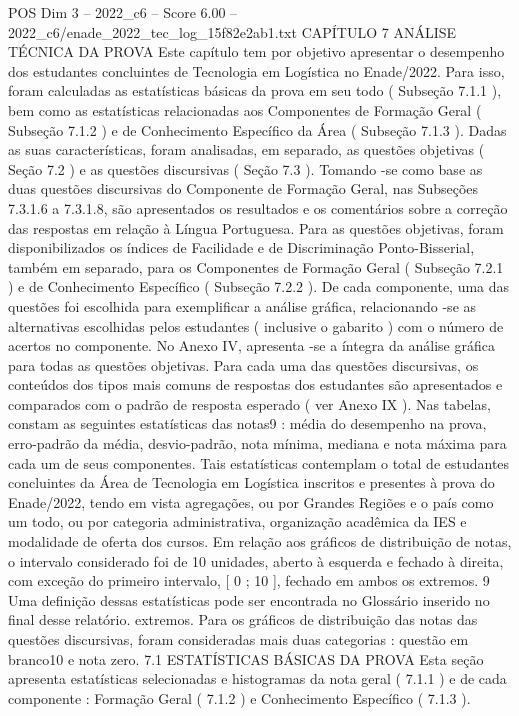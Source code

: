 \begin{textsample}{POS Dim 3 – 2022\_c6 – Score 6.00 – 2022\_c6/enade\_2022\_tec\_log\_15f82e2ab1.txt}  \label{ex:f3_pos_028}
CAPÍTULO 7 ANÁLISE TÉCNICA DA PROVA Este capítulo tem por objetivo apresentar o desempenho dos estudantes concluintes de Tecnologia em Logística no Enade/2022.
Para isso, foram calculadas as estatísticas básicas da prova em seu todo ( Subseção 7.1.1 ), bem como as estatísticas relacionadas aos Componentes de Formação Geral ( Subseção 7.1.2 ) e de Conhecimento Específico da Área ( Subseção 7.1.3 ).
Dadas as suas características, foram analisadas, em separado, as questões objetivas ( Seção 7.2 ) e as questões discursivas ( Seção 7.3 ).
Tomando -se como base as duas questões discursivas do Componente de Formação Geral, nas Subseções 7.3.1.6 a 7.3.1.8, são apresentados os resultados e os comentários sobre a correção das respostas em relação à Língua Portuguesa.
Para as questões objetivas, foram disponibilizados os índices de Facilidade e de Discriminação Ponto-Bisserial, também em separado, para os Componentes de Formação Geral ( Subseção 7.2.1 ) e de Conhecimento Específico ( Subseção 7.2.2 ).
De cada componente, uma das questões foi escolhida para exemplificar a análise gráfica, relacionando -se as alternativas escolhidas pelos estudantes ( inclusive o gabarito ) com o número de acertos no componente.
No Anexo IV, apresenta -se a íntegra da análise gráfica para todas as questões objetivas.
Para cada uma das questões discursivas, os conteúdos dos tipos mais comuns de respostas dos estudantes são apresentados e comparados com o padrão de resposta esperado ( ver Anexo IX ).
Nas tabelas, constam as seguintes estatísticas das notas9 : média do desempenho na prova, erro-padrão da média, desvio-padrão, nota mínima, mediana e nota máxima para cada um de seus componentes.
Tais estatísticas contemplam o total de estudantes concluintes da Área de Tecnologia em Logística inscritos e presentes à prova do Enade/2022, tendo em vista agregações, ou por Grandes Regiões e o país como um todo, ou por categoria administrativa, organização acadêmica da IES e modalidade de oferta dos cursos.
Em relação aos gráficos de distribuição de notas, o intervalo considerado foi de 10 unidades, aberto à esquerda e fechado à direita, com exceção do primeiro intervalo, [ 0 ; 10 ], fechado em ambos os extremos. 9 Uma definição dessas estatísticas pode ser encontrada no Glossário inserido no final desse relatório. extremos.
Para os gráficos de distribuição das notas das questões discursivas, foram consideradas mais duas categorias : questão em branco10 e nota zero. 7.1 ESTATÍSTICAS BÁSICAS DA PROVA Esta seção apresenta estatísticas selecionadas e histogramas da nota geral ( 7.1.1 ) e de cada componente : Formação Geral ( 7.1.2 ) e Conhecimento Específico ( 7.1.3 ).

\end{textsample}
